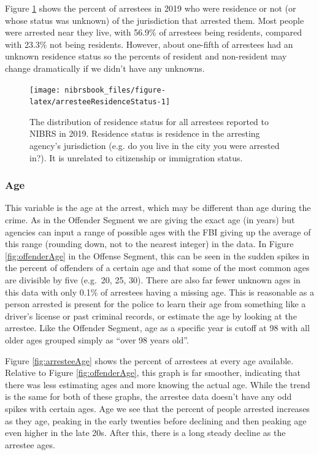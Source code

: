 \documentclass[
  12pt,
  openany]{book}
\begin{document}
Figure \ref{fig:arresteeResidenceStatus} shows the percent of arrestees in 2019 who were residence or not (or whose status was unknown) of the jurisdiction that arrested them. Most people were arrested near they live, with 56.9\% of arrestees being residents, compared with 23.3\% not being residents. However, about one-fifth of arrestees had an unknown residence status so the percents of resident and non-resident may change dramatically if we didn't have any unknowns.

\begin{figure}

{\centering \texttt{[image: nibrsbook\_files/figure-latex/arresteeResidenceStatus-1]} 

}

\caption{The distribution of residence status for all arrestees reported to NIBRS in 2019. Residence status is residence in the arresting agency's jurisdiction (e.g. do you live in the city you were arrested in?). It is unrelated to citizenship or immigration status.}\label{fig:arresteeResidenceStatus}
\end{figure}

\hypertarget{age-2}{%
\subsubsection{Age}\label{age-2}}

This variable is the age at the arrest, which may be different than age during the crime. As in the Offender Segment we are giving the exact age (in years) but agencies can input a range of possible ages with the FBI giving up the average of this range (rounding down, not to the nearest integer) in the data. In Figure \ref{fig:offenderAge} in the Offense Segment, this can be seen in the sudden spikes in the percent of offenders of a certain age and that some of the most common ages are divisible by five (e.g.~20, 25, 30). There are also far fewer unknown ages in this data with only 0.1\% of arrestees having a missing age. This is reasonable as a person arrested is present for the police to learn their age from something like a driver's license or past criminal records, or estimate the age by looking at the arrestee. Like the Offender Segment, age as a specific year is cutoff at 98 with all older ages grouped simply as ``over 98 years old''.

Figure \ref{fig:arresteeAge} shows the percent of arrestees at every age available. Relative to Figure \ref{fig:offenderAge}, this graph is far smoother, indicating that there was less estimating ages and more knowing the actual age. While the trend is the same for both of these graphs, the arrestee data doesn't have any odd spikes with certain ages. Age we see that the percent of people arrested increases as they age, peaking in the early twenties before declining and then peaking age even higher in the late 20s. After this, there is a long steady decline as the arrestee ages.
\end{document}
